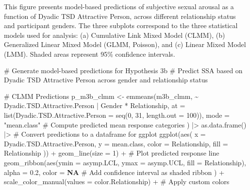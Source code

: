 \documentclass[
  bookmarksnumbered]{article}
\newenvironment{Shaded}{\begin{snugshade}}{\end{snugshade}}
\newcommand{\AttributeTok}[1]{\textcolor[rgb]{0.80,0.80,0.80}{#1}}
\newcommand{\CommentTok}[1]{\textcolor[rgb]{0.50,0.62,0.50}{#1}}
\newcommand{\ConstantTok}[1]{\textcolor[rgb]{0.86,0.64,0.64}{\textbf{#1}}}
\newcommand{\DecValTok}[1]{\textcolor[rgb]{0.86,0.86,0.80}{#1}}
\newcommand{\FloatTok}[1]{\textcolor[rgb]{0.75,0.75,0.82}{#1}}
\newcommand{\FunctionTok}[1]{\textcolor[rgb]{0.94,0.94,0.56}{#1}}
\newcommand{\NormalTok}[1]{\textcolor[rgb]{0.80,0.80,0.80}{#1}}
\newcommand{\OtherTok}[1]{\textcolor[rgb]{0.94,0.94,0.56}{#1}}
\newcommand{\SpecialCharTok}[1]{\textcolor[rgb]{0.86,0.64,0.64}{#1}}
\newcommand{\StringTok}[1]{\textcolor[rgb]{0.80,0.58,0.58}{#1}}
\begin{document}
This figure presents model-based predictions of subjective sexual arousal as a function of Dyadic TSD Attractive Person, across different relationship status and participant genders. The three subplots correspond to the three statistical models used for analysis: (a) Cumulative Link Mixed Model (CLMM), (b) Generalized Linear Mixed Model (GLMM, Poisson), and (c) Linear Mixed Model (LMM). Shaded areas represent 95\% confidence intervals.

\begin{Shaded}
\begin{Highlighting}[]
\CommentTok{\# Generate model{-}based predictions for Hypothesis 3b}
\CommentTok{\# Predict SSA based on Dyadic TSD Attractive Person across gender and relationship status}

\CommentTok{\# CLMM Predictions}
\NormalTok{p\_m3b\_clmm }\OtherTok{\textless{}{-}} \FunctionTok{emmeans}\NormalTok{(m3b\_clmm, }\SpecialCharTok{\textasciitilde{}}\NormalTok{ Dyadic.TSD.Attractive.Person }\SpecialCharTok{|}\NormalTok{ Gender }\SpecialCharTok{*}\NormalTok{ Relationship,}
  \AttributeTok{at =} \FunctionTok{list}\NormalTok{(}\AttributeTok{Dyadic.TSD.Attractive.Person =} \FunctionTok{seq}\NormalTok{(}\DecValTok{0}\NormalTok{, }\DecValTok{31}\NormalTok{, }\AttributeTok{length.out =} \DecValTok{100}\NormalTok{)),}
  \AttributeTok{mode =} \StringTok{"mean.class"} \CommentTok{\# Compute predicted mean response categories}
\NormalTok{) }\SpecialCharTok{|\textgreater{}}
  \FunctionTok{as.data.frame}\NormalTok{() }\SpecialCharTok{|\textgreater{}} \CommentTok{\# Convert predictions to a dataframe for ggplot}
  \FunctionTok{ggplot}\NormalTok{(}\FunctionTok{aes}\NormalTok{(}
    \AttributeTok{x =}\NormalTok{ Dyadic.TSD.Attractive.Person, }\AttributeTok{y =}\NormalTok{ mean.class,}
    \AttributeTok{color =}\NormalTok{ Relationship, }\AttributeTok{fill =}\NormalTok{ Relationship}
\NormalTok{  )) }\SpecialCharTok{+}
  \FunctionTok{geom\_line}\NormalTok{(}\AttributeTok{size =} \DecValTok{1}\NormalTok{) }\SpecialCharTok{+} \CommentTok{\# Plot predicted response line}
  \FunctionTok{geom\_ribbon}\NormalTok{(}\FunctionTok{aes}\NormalTok{(}\AttributeTok{ymin =}\NormalTok{ asymp.LCL, }\AttributeTok{ymax =}\NormalTok{ asymp.UCL, }\AttributeTok{fill =}\NormalTok{ Relationship),}
    \AttributeTok{alpha =} \FloatTok{0.2}\NormalTok{, }\AttributeTok{color =} \ConstantTok{NA} \CommentTok{\# Add confidence interval as shaded ribbon}
\NormalTok{  ) }\SpecialCharTok{+}
  \FunctionTok{scale\_color\_manual}\NormalTok{(}\AttributeTok{values =}\NormalTok{ color.Relationship) }\SpecialCharTok{+} \CommentTok{\# Apply custom colors}

\end{Highlighting}
\end{Shaded}
\end{document}
